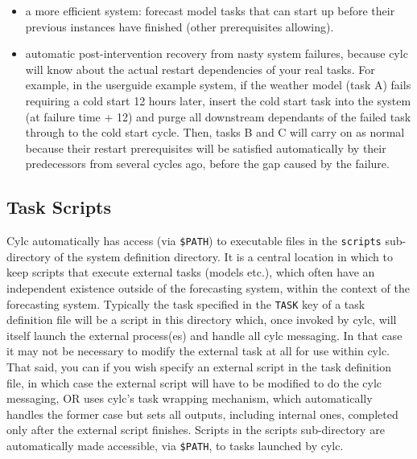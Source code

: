 \documentclass[11pt,a4paper]{article}
\begin{document}
\begin{itemize}

    \item a more efficient system: forecast model tasks that can start
        up before their previous instances have finished (other
        prerequisites allowing).  
    
    \item automatic post-intervention recovery from nasty system
        failures, because cylc will know about the actual restart
        dependencies of your real tasks. For example, in the userguide
        example system, if the weather model (task A) fails requiring a
        cold start 12 hours later, insert the cold start task into the
        system (at failure time + 12) and purge all downstream dependants of 
        the failed task through to the cold start cycle. Then, tasks
        B and C will carry on as normal because their restart
        prerequisites will be satisfied automatically by their
        predecessors from several cycles ago, before the gap caused by
        the failure.

\end{itemize}

\pagebreak
\subsection{Task Scripts}
\label{TaskScripts}

Cylc automatically has access (via \lstinline=$PATH=) to executable
files in the \lstinline=scripts= sub-directory of the system definition
directory. It is a central location in which to keep scripts that
execute external tasks (models etc.), which often have an independent
existence outside of the forecasting system, within the context of the
forecasting system.
Typically the task specified in the \lstinline=TASK=
key of a task definition file will be a script in this directory which,
once invoked by cylc, will itself launch the external process(es) and
handle all cylc messaging. In that case it may not be necessary to
modify the external task at all for use within cylc. That said, you can
if you wish specify an external script in the task definition file, in
which case the external script will have to be modified to do the cylc
messaging, OR uses cylc's task wrapping mechanism, which automatically
handles the former case but sets all outputs, including internal ones,
completed only after the external script finishes.  Scripts in the
scripts sub-directory are automatically made accessible, via 
\lstinline=$PATH=, to tasks launched by cylc. 
\end{document}
